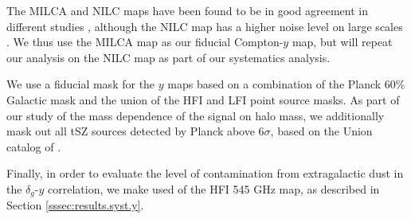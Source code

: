 \documentclass[useAMS,usenatbib]{mn2e}
\begin{document}
    The MILCA and NILC maps have been found to be in good agreement in different studies \citep{2016A&A...594A..22P}, although the NILC map has a higher noise level on large scales \citep{2016A&A...594A..22P}. We thus use the MILCA map as our fiducial Compton-$y$ map, but will repeat our analysis on the NILC map as part of our systematics analysis.
    
    We use a fiducial mask for the $y$ maps based on a combination of the Planck 60\% Galactic mask and the union of the HFI and LFI point source masks. As part of our study of the mass dependence of the signal on halo mass, we additionally mask out all tSZ sources detected by Planck above 6$\sigma$, based on the Union catalog of \cite{2016A&A...594A..27P}.
    
    Finally, in order to evaluate the level of contamination from extragalactic dust in the $\delta_g$-$y$ correlation, we make used of the HFI 545 GHz map, as described in Section \ref{sssec:results.syst.y}.
    
\end{document}
